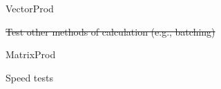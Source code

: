 
\begin{DoxyItemize}
\item Vector\+Prod
\begin{DoxyItemize}
\item \sout{Test other methods of calculation (e.\+g., batching)}
\end{DoxyItemize}
\item Matrix\+Prod
\begin{DoxyItemize}
\item Speed tests 
\end{DoxyItemize}
\end{DoxyItemize}